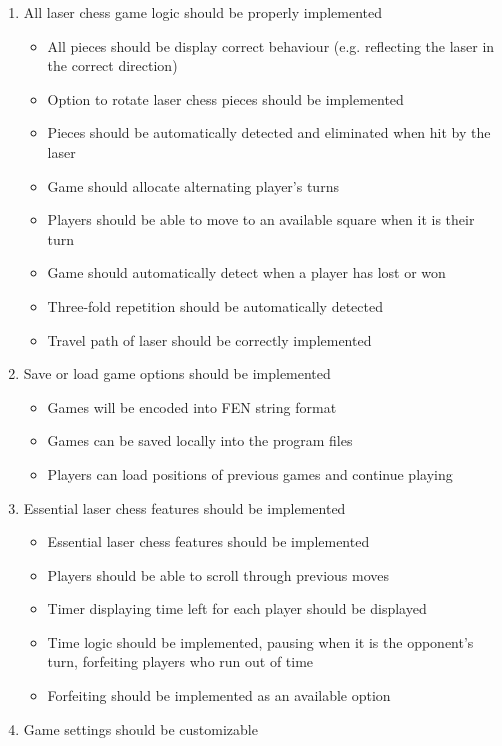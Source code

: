 \documentclass[../main/main.tex]{subfiles}
\begin{document}
\begin{enumerate}
\item All laser chess game logic should be properly implemented
    \begin{itemize}
    \item All pieces should be display correct behaviour (e.g. reflecting the laser in the correct direction)
    \item Option to rotate laser chess pieces should be implemented
    \item Pieces should be automatically detected and eliminated when hit by the laser
    \item Game should allocate alternating player’s turns
    \item Players should be able to move to an available square when it is their turn
    \item Game should automatically detect when a player has lost or won
    \item Three-fold repetition should be automatically detected
    \item Travel path of laser should be correctly implemented
    \end{itemize}
\item Save or load game options should be implemented
    \begin{itemize}
    \item Games will be encoded into FEN string format
    \item Games can be saved locally into the program files
    \item Players can load positions of previous games and continue playing
    \end{itemize}
\item Essential laser chess features should be implemented
    \begin{itemize}
    \item Essential laser chess features should be implemented
    \item Players should be able to scroll through previous moves
    \item Timer displaying time left for each player should be displayed
    \item Time logic should be implemented, pausing when it is the opponent’s turn, forfeiting players who run out of time
    \item Forfeiting should be implemented as an available option
    \end{itemize}
\item Game settings should be customizable

\end{enumerate}
\end{document}
